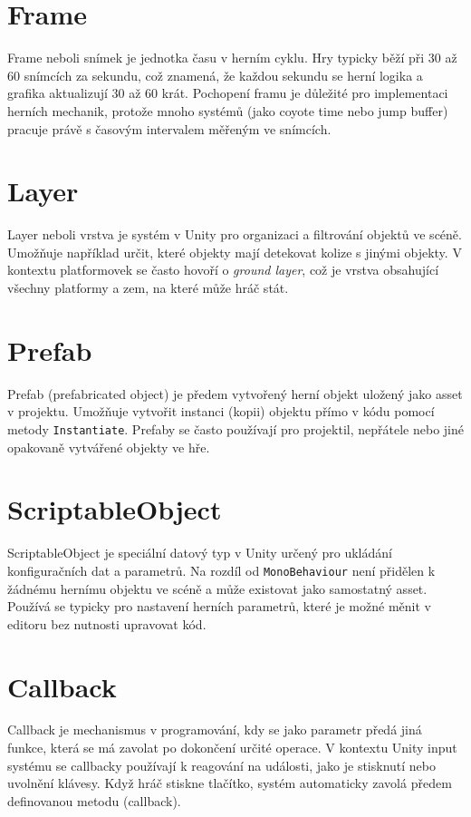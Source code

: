 \section{Frame}

Frame neboli snímek je jednotka času v herním cyklu. Hry typicky běží při 30 až 60 snímcích za sekundu, což znamená, že každou sekundu se herní logika a grafika aktualizují 30 až 60 krát. Pochopení framu je důležité pro implementaci herních mechanik, protože mnoho systémů (jako coyote time nebo jump buffer) pracuje právě s časovým intervalem měřeným ve snímcích.

\newpage
\section{Layer}

Layer neboli vrstva je systém v Unity pro organizaci a filtrování objektů ve scéně. Umožňuje například určit, které objekty mají detekovat kolize s jinými objekty. V kontextu platformovek se často hovoří o \textit{ground layer}, což je vrstva obsahující všechny platformy a zem, na které může hráč stát.

\section{Prefab}

Prefab (prefabricated object) je předem vytvořený herní objekt uložený jako asset v projektu. Umožňuje vytvořit instanci (kopii) objektu přímo v kódu pomocí metody \texttt{Instantiate}. Prefaby se často používají pro projektil, nepřátele nebo jiné opakovaně vytvářené objekty ve hře.

\section{ScriptableObject}

ScriptableObject je speciální datový typ v Unity určený pro ukládání konfiguračních dat a parametrů. Na rozdíl od \texttt{MonoBehaviour} není přidělen k žádnému hernímu objektu ve scéně a může existovat jako samostatný asset. Používá se typicky pro nastavení herních parametrů, které je možné měnit v editoru bez nutnosti upravovat kód.

\section{Callback}

Callback je mechanismus v programování, kdy se jako parametr předá jiná funkce, která se má zavolat po dokončení určité operace. V kontextu Unity input systému se callbacky používají k reagování na události, jako je stisknutí nebo uvolnění klávesy. Když hráč stiskne tlačítko, systém automaticky zavolá předem definovanou metodu (callback).